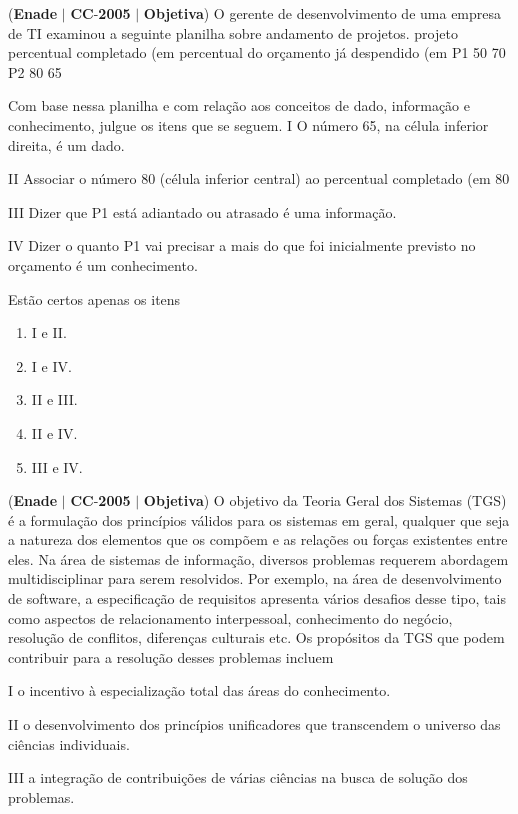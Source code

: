 \documentclass{exam}
\begin{document}
\begin{questions}
\question (\textbf{Enade} $|$ \textbf{CC}-\textbf{2005} $|$ \textbf{Objetiva})
O gerente de desenvolvimento de uma empresa de
TI examinou a seguinte planilha sobre andamento de
projetos.
projeto
percentual
completado (em %
percentual do orçamento
já despendido (em %
P1 50 70
P2 80 65

Com base nessa planilha e com relação aos conceitos de dado,
informação e conhecimento, julgue os itens que se seguem.
I O número 65, na célula inferior direita, é um dado.

II Associar o número 80 (célula inferior central) ao percentual
completado (em %
80%

III Dizer que P1 está adiantado ou atrasado é uma informação.

IV Dizer o quanto P1 vai precisar a mais do que foi
inicialmente previsto no orçamento é um conhecimento.

Estão certos apenas os itens
	\begin{enumerate}[label=\alph*)]
		\item  I e II.
		\item  I e IV.
		\item  II e III.
		\item  II e IV.
		\item  III e IV.
	\end{enumerate}

\question (\textbf{Enade} $|$ \textbf{CC}-\textbf{2005} $|$ \textbf{Objetiva})
O objetivo da Teoria Geral dos Sistemas (TGS) é a formulação
dos princípios válidos para os sistemas em geral, qualquer que
seja a natureza dos elementos que os compõem e as relações ou
forças existentes entre eles. Na área de sistemas de informação,
diversos problemas requerem abordagem multidisciplinar para
serem resolvidos. Por exemplo, na área de desenvolvimento de
software, a especificação de requisitos apresenta vários desafios
desse tipo, tais como aspectos de relacionamento interpessoal,
conhecimento do negócio, resolução de conflitos, diferenças
culturais etc. Os propósitos da TGS que podem contribuir para
a resolução desses problemas incluem

I o incentivo à especialização total das áreas do
conhecimento.

II o desenvolvimento dos princípios unificadores que
transcendem o universo das ciências individuais.

III a integração de contribuições de várias ciências na busca de
solução dos problemas.


\end{questions}
\end{document}
